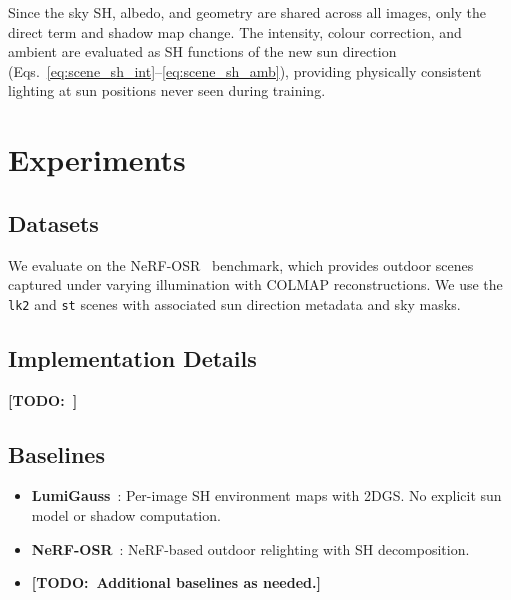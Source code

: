 \documentclass[conference]{IEEEtran}
\newcommand{\todo}[1]{{\color{red}\textbf{[TODO:~#1]}}}
\begin{document}
Since the sky SH, albedo, and geometry are shared across all images, only the direct term and shadow map change.
The intensity, colour correction, and ambient are evaluated as SH functions of the new sun direction (Eqs.~\ref{eq:scene_sh_int}--\ref{eq:scene_sh_amb}), providing physically consistent lighting at sun positions never seen during training.

\section{Experiments}
\label{sec:experiments}

\subsection{Datasets}

We evaluate on the NeRF-OSR~\cite{rudnev2022nerfOSR} benchmark, which provides outdoor scenes captured under varying illumination with COLMAP reconstructions.
We use the \texttt{lk2} and \texttt{st} scenes with associated sun direction metadata and sky masks.

\subsection{Implementation Details}

\todo{}


\subsection{Baselines}

\begin{itemize}
    \item \textbf{LumiGauss}~\cite{joaxkal2024lumigauss}: Per-image SH environment maps with 2DGS. No explicit sun model or shadow computation.
    \item \textbf{NeRF-OSR}~\cite{rudnev2022nerfOSR}: NeRF-based outdoor relighting with SH decomposition.
    \item \todo{Additional baselines as needed.}
\end{itemize}
\end{document}
